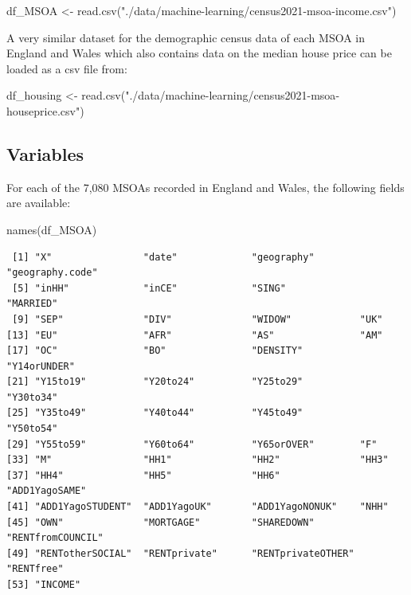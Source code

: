 \documentclass[
  letterpaper,
  DIV=11,
  numbers=noendperiod]{scrreprt}
\newenvironment{Shaded}{\begin{snugshade}}{\end{snugshade}}
\newcommand{\FunctionTok}[1]{\textcolor[rgb]{0.28,0.35,0.67}{#1}}
\newcommand{\NormalTok}[1]{\textcolor[rgb]{0.00,0.23,0.31}{#1}}
\newcommand{\OtherTok}[1]{\textcolor[rgb]{0.00,0.23,0.31}{#1}}
\newcommand{\StringTok}[1]{\textcolor[rgb]{0.13,0.47,0.30}{#1}}
\begin{document}
\begin{Shaded}
\begin{Highlighting}[]
\NormalTok{df\_MSOA }\OtherTok{\textless{}{-}} \FunctionTok{read.csv}\NormalTok{(}\StringTok{"./data/machine{-}learning/census2021{-}msoa{-}income.csv"}\NormalTok{)}
\end{Highlighting}
\end{Shaded}

A very similar dataset for the demographic census data of each MSOA in
England and Wales which also contains data on the median house price can
be loaded as a csv file from:

\begin{Shaded}
\begin{Highlighting}[]
\NormalTok{df\_housing }\OtherTok{\textless{}{-}} \FunctionTok{read.csv}\NormalTok{(}\StringTok{"./data/machine{-}learning/census2021{-}msoa{-}houseprice.csv"}\NormalTok{)}
\end{Highlighting}
\end{Shaded}

\hypertarget{variables-3}{%
\subsection*{Variables}\label{variables-3}}

For each of the 7,080 MSOAs recorded in England and Wales, the following
fields are available:

\begin{Shaded}
\begin{Highlighting}[]
\FunctionTok{names}\NormalTok{(df\_MSOA)}
\end{Highlighting}
\end{Shaded}

\begin{verbatim}
 [1] "X"                "date"             "geography"        "geography.code"  
 [5] "inHH"             "inCE"             "SING"             "MARRIED"         
 [9] "SEP"              "DIV"              "WIDOW"            "UK"              
[13] "EU"               "AFR"              "AS"               "AM"              
[17] "OC"               "BO"               "DENSITY"          "Y14orUNDER"      
[21] "Y15to19"          "Y20to24"          "Y25to29"          "Y30to34"         
[25] "Y35to49"          "Y40to44"          "Y45to49"          "Y50to54"         
[29] "Y55to59"          "Y60to64"          "Y65orOVER"        "F"               
[33] "M"                "HH1"              "HH2"              "HH3"             
[37] "HH4"              "HH5"              "HH6"              "ADD1YagoSAME"    
[41] "ADD1YagoSTUDENT"  "ADD1YagoUK"       "ADD1YagoNONUK"    "NHH"             
[45] "OWN"              "MORTGAGE"         "SHAREDOWN"        "RENTfromCOUNCIL" 
[49] "RENTotherSOCIAL"  "RENTprivate"      "RENTprivateOTHER" "RENTfree"        
[53] "INCOME"          
\end{verbatim}
\end{document}
